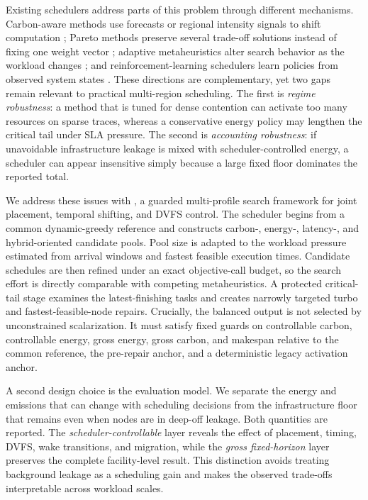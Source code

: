 Existing schedulers address parts of this problem through different mechanisms. Carbon-aware methods use forecasts or regional intensity signals to shift computation \cite{zhai2024edge,zhai2025forecast,calavaro2026functionvariants}; Pareto methods preserve several trade-off solutions instead of fixing one weight vector \cite{abraham2025multi,Etheredge2026Pulse}; adaptive metaheuristics alter search behavior as the workload changes \cite{satouf2025metaheuristic,tandon2025novel}; and reinforcement-learning schedulers learn policies from observed system states \cite{shen2025reinforcement,anand2025eadrl,nasir2026relto,sravan2026drl}. These directions are complementary, yet two gaps remain relevant to practical multi-region scheduling. The first is \emph{regime robustness}: a method that is tuned for dense contention can activate too many resources on sparse traces, whereas a conservative energy policy may lengthen the critical tail under SLA pressure. The second is \emph{accounting robustness}: if unavoidable infrastructure leakage is mixed with scheduler-controlled energy, a scheduler can appear insensitive simply because a large fixed floor dominates the reported total.

We address these issues with \method, a guarded multi-profile search framework for joint placement, temporal shifting, and DVFS control. The scheduler begins from a common dynamic-greedy reference and constructs carbon-, energy-, latency-, and hybrid-oriented candidate pools. Pool size is adapted to the workload pressure estimated from arrival windows and fastest feasible execution times. Candidate schedules are then refined under an exact objective-call budget, so the search effort is directly comparable with competing metaheuristics. A protected critical-tail stage examines the latest-finishing tasks and creates narrowly targeted turbo and fastest-feasible-node repairs. Crucially, the balanced output is not selected by unconstrained scalarization. It must satisfy fixed guards on controllable carbon, controllable energy, gross energy, gross carbon, and makespan relative to the common reference, the pre-repair anchor, and a deterministic legacy activation anchor.

A second design choice is the evaluation model. We separate the energy and emissions that can change with scheduling decisions from the infrastructure floor that remains even when nodes are in deep-off leakage. Both quantities are reported. The \emph{scheduler-controllable} layer reveals the effect of placement, timing, DVFS, wake transitions, and migration, while the \emph{gross fixed-horizon} layer preserves the complete facility-level result. This distinction avoids treating background leakage as a scheduling gain and makes the observed trade-offs interpretable across workload scales.


